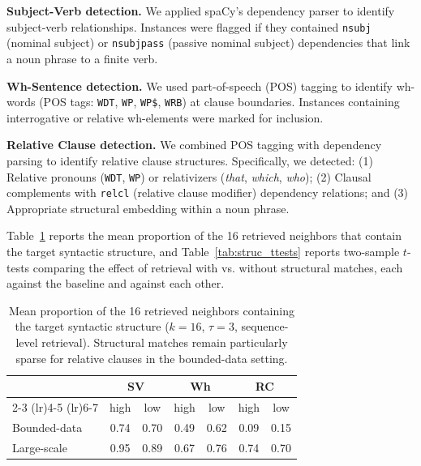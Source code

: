 \textbf{Subject-Verb detection.} We applied spaCy's dependency parser to identify subject-verb relationships. Instances were flagged if they contained \texttt{nsubj} (nominal subject) or \texttt{nsubjpass} (passive nominal subject) dependencies that link a noun phrase to a finite verb.

\textbf{Wh-Sentence detection.} We used part-of-speech (POS) tagging to identify wh-words (POS tags: \texttt{WDT}, \texttt{WP}, \texttt{WP\$}, \texttt{WRB}) at clause boundaries. Instances containing interrogative or relative wh-elements were marked for inclusion.

\textbf{Relative Clause detection.} We combined POS tagging with dependency parsing to identify relative clause structures. Specifically, we detected: (1) Relative pronouns (\texttt{WDT}, \texttt{WP}) or relativizers (\emph{that}, \emph{which}, \emph{who}); (2) Clausal complements with \texttt{relcl} (relative clause modifier) dependency relations; and (3) Appropriate structural embedding within a noun phrase.



Table~\ref{tab:struc_rate} reports the mean proportion of the 16 retrieved neighbors that contain the target syntactic structure, and Table~\ref{tab:struc_ttests} reports two-sample $t$-tests comparing the effect of retrieval with vs. without structural matches, each against the baseline and against each other.

\begin{table}[ht]
\centering
\small
\caption{Mean proportion of the 16 retrieved neighbors containing the
target syntactic structure ($k=16$, $\tau=3$, sequence-level retrieval). Structural matches remain particularly sparse for relative clauses in the bounded-data setting.}
\label{tab:struc_rate}
\begin{tabular}{lcccccc}
\toprule
& \multicolumn{2}{c}{\textbf{SV}}
& \multicolumn{2}{c}{\textbf{Wh}}
& \multicolumn{2}{c}{\textbf{RC}} \\
\cmidrule(lr){2-3}
\cmidrule(lr){4-5}
\cmidrule(lr){6-7}
& high & low & high & low & high & low \\
\midrule
Bounded-data & 0.74 & 0.70 & 0.49 & 0.62 & 0.09 & 0.15 \\
Large-scale     & 0.95 & 0.89 & 0.67 & 0.76 & 0.74 & 0.70 \\
\bottomrule
\end{tabular}
\end{table}

